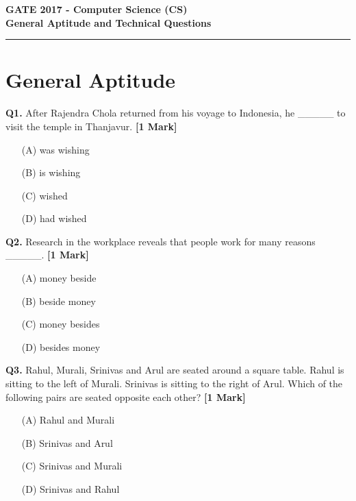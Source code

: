 \documentclass[11pt]{article}
\newcommand{\questiona}[2]{
    \noindent\textbf{Q#2.} #1 \hfill \textbf{[1 Mark]}
}
\begin{document}
\begin{center}
    \Large\textbf{GATE 2017 - Computer Science (CS)} \\
    \large\textbf{General Aptitude and Technical Questions} \\
    \rule{\textwidth}{0.5pt} %
\end{center}

\vspace{0.5cm}

\section*{General Aptitude}

\questiona{After Rajendra Chola returned from his voyage to Indonesia, he \_\_\_\_\_ to visit the temple in Thanjavur.}{1}
\begin{enumerate}
    \item[(A)] was wishing  
    \item[(B)] is wishing  
    \item[(C)] wished  
    \item[(D)] had wished  
\end{enumerate}
\vspace{0.5cm}

\questiona{Research in the workplace reveals that people work for many reasons \_\_\_\_\_.}{2}
\begin{enumerate}
    \item[(A)] money beside  
    \item[(B)] beside money  
    \item[(C)] money besides  
    \item[(D)] besides money  
\end{enumerate}
\vspace{0.5cm}

\questiona{Rahul, Murali, Srinivas and Arul are seated around a square table. Rahul is sitting to the left of Murali. Srinivas is sitting to the right of Arul. Which of the following pairs are seated opposite each other?}{3}
\begin{enumerate}
    \item[(A)] Rahul and Murali  
    \item[(B)] Srinivas and Arul  
    \item[(C)] Srinivas and Murali  
    \item[(D)] Srinivas and Rahul  
\end{enumerate}
\vspace{0.5cm}
\end{document}
